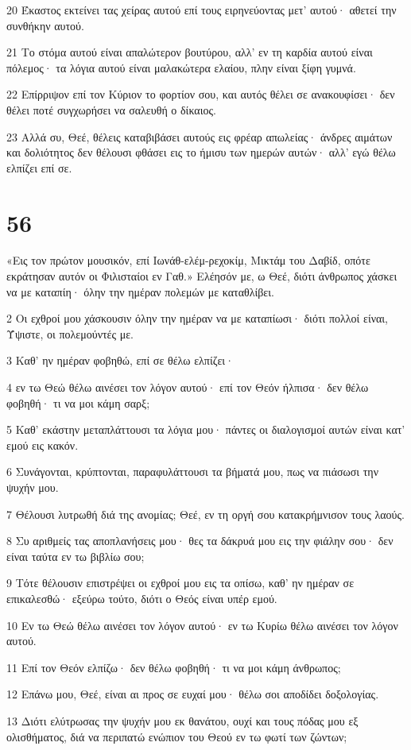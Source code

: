 \par 20 Έκαστος εκτείνει τας χείρας αυτού επί τους ειρηνεύοντας μετ' αυτού· αθετεί την συνθήκην αυτού.
\par 21 Το στόμα αυτού είναι απαλώτερον βουτύρου, αλλ' εν τη καρδία αυτού είναι πόλεμος· τα λόγια αυτού είναι μαλακώτερα ελαίου, πλην είναι ξίφη γυμνά.
\par 22 Επίρριψον επί τον Κύριον το φορτίον σου, και αυτός θέλει σε ανακουφίσει· δεν θέλει ποτέ συγχωρήσει να σαλευθή ο δίκαιος.
\par 23 Αλλά συ, Θεέ, θέλεις καταβιβάσει αυτούς εις φρέαρ απωλείας· άνδρες αιμάτων και δολιότητος δεν θέλουσι φθάσει εις το ήμισυ των ημερών αυτών· αλλ' εγώ θέλω ελπίζει επί σε.

\chapter{56}

\par «Εις τον πρώτον μουσικόν, επί Ιωνάθ-ελέμ-ρεχοκίμ, Μικτάμ του Δαβίδ, οπότε εκράτησαν αυτόν οι Φιλισταίοι εν Γαθ.» Ελέησόν με, ω Θεέ, διότι άνθρωπος χάσκει να με καταπίη· όλην την ημέραν πολεμών με καταθλίβει.
\par 2 Οι εχθροί μου χάσκουσιν όλην την ημέραν να με καταπίωσι· διότι πολλοί είναι, Ύψιστε, οι πολεμούντές με.
\par 3 Καθ' ην ημέραν φοβηθώ, επί σε θέλω ελπίζει·
\par 4 εν τω Θεώ θέλω αινέσει τον λόγον αυτού· επί τον Θεόν ήλπισα· δεν θέλω φοβηθή· τι να μοι κάμη σαρξ;
\par 5 Καθ' εκάστην μεταπλάττουσι τα λόγια μου· πάντες οι διαλογισμοί αυτών είναι κατ' εμού εις κακόν.
\par 6 Συνάγονται, κρύπτονται, παραφυλάττουσι τα βήματά μου, πως να πιάσωσι την ψυχήν μου.
\par 7 Θέλουσι λυτρωθή διά της ανομίας; Θεέ, εν τη οργή σου κατακρήμνισον τους λαούς.
\par 8 Συ αριθμείς τας αποπλανήσεις μου· θες τα δάκρυά μου εις την φιάλην σου· δεν είναι ταύτα εν τω βιβλίω σου;
\par 9 Τότε θέλουσιν επιστρέψει οι εχθροί μου εις τα οπίσω, καθ' ην ημέραν σε επικαλεσθώ· εξεύρω τούτο, διότι ο Θεός είναι υπέρ εμού.
\par 10 Εν τω Θεώ θέλω αινέσει τον λόγον αυτού· εν τω Κυρίω θέλω αινέσει τον λόγον αυτού.
\par 11 Επί τον Θεόν ελπίζω· δεν θέλω φοβηθή· τι να μοι κάμη άνθρωπος;
\par 12 Επάνω μου, Θεέ, είναι αι προς σε ευχαί μου· θέλω σοι αποδίδει δοξολογίας.
\par 13 Διότι ελύτρωσας την ψυχήν μου εκ θανάτου, ουχί και τους πόδας μου εξ ολισθήματος, διά να περιπατώ ενώπιον του Θεού εν τω φωτί των ζώντων;

